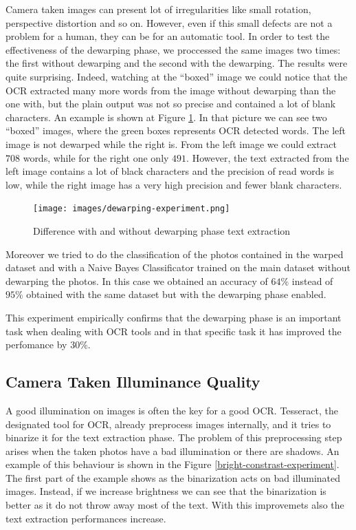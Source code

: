 \documentclass[10pt,twocolumn,letterpaper]{article}
\begin{document}
Camera taken images can present lot of irregularities like small
rotation, perspective distortion and so on. However, even if this
small defects are not a problem for a human, they can be for an
automatic tool. In order to test the effectiveness of the dewarping
phase, we proccessed the same images two times: the first without
dewarping and the second with the dewarping. The results were quite
surprising. Indeed, watching at the ``boxed'' image we could notice
that the OCR extracted many more words from the image without
dewarping than the one with, but the plain output was not so precise
and contained a lot of blank characters. An example is shown at Figure
\ref{dewarping-experiment}. In that picture we can see two ``boxed''
images, where the green boxes represents OCR detected words. The left
image is not dewarped while the right is. From the left image we could
extract $708$ words, while for the right one only $491$. However, the
text extracted from the left image contains a lot of black characters
and the precision of read words is low, while the right image has a
very high precision and fewer blank characters.

\begin{figure}[b]
  \centering
  \texttt{[image: images/dewarping-experiment.png]}
  \caption{Difference with and without dewarping phase text extraction}
  \label{dewarping-experiment}
\end{figure}

Moreover we tried to do the classification of the photos contained in
the warped dataset and with a Naive Bayes Classificator trained on the
main dataset without dewarping the photos. In this case we obtained an
accuracy of $64\%$ instead of $95\%$ obtained with the same dataset but
with the dewarping phase enabled.

This experiment empirically confirms that the dewarping phase is an
important task when dealing with OCR tools and in that specific task
it has improved the perfomance by $30\%$.

\subsection{Camera Taken Illuminance Quality}
\label{subsec:camera-taken-illuminance-quality}

A good illumination on images is often the key for a good
OCR. Tesseract, the designated tool for OCR, already preprocess images
internally, and it tries to binarize it for the text extraction phase.
The problem of this preprocessing step arises when the taken photos
have a bad illumination or there are shadows. An example of this
behaviour is shown in the Figure
\ref{bright-constrast-experiment}. The first part of the example shows
as the binarization acts on bad illuminated images.  Instead, if we
increase brightness we can see that the binarization is better as it
do not throw away most of the text. With this improvemets also the
text extraction performances increase.
\end{document}
